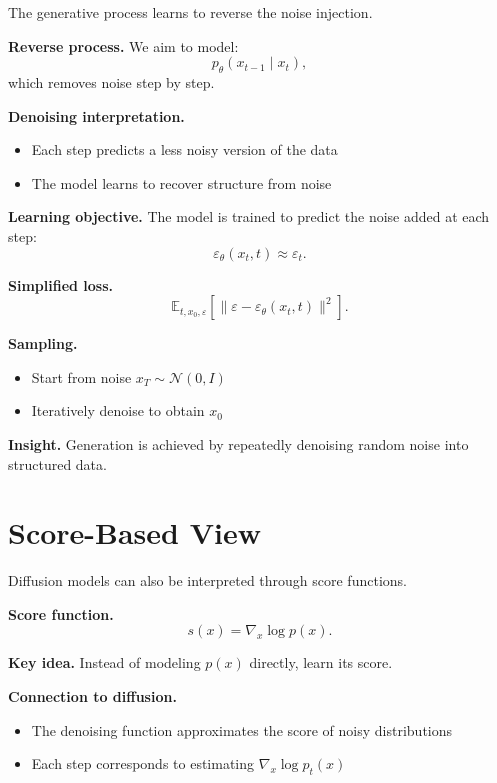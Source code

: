 The generative process learns to reverse the noise injection.

\medskip

\noindent
\textbf{Reverse process.}  
We aim to model:
\[
p_\theta(x_{t-1} \mid x_t),
\]
which removes noise step by step.

\medskip

\noindent
\textbf{Denoising interpretation.}
\begin{itemize}
    \item Each step predicts a less noisy version of the data
    \item The model learns to recover structure from noise
\end{itemize}

\medskip

\noindent
\textbf{Learning objective.}  
The model is trained to predict the noise added at each step:
\[
\varepsilon_\theta(x_t, t) \approx \varepsilon_t.
\]

\medskip

\noindent
\textbf{Simplified loss.}
\[
\mathbb{E}_{t, x_0, \varepsilon}
\left[
\| \varepsilon - \varepsilon_\theta(x_t, t) \|^2
\right].
\]

\medskip

\noindent
\textbf{Sampling.}
\begin{itemize}
    \item Start from noise $x_T \sim \mathcal{N}(0, I)$
    \item Iteratively denoise to obtain $x_0$
\end{itemize}

\medskip

\noindent
\textbf{Insight.}  
Generation is achieved by repeatedly denoising random noise into structured data.

\section{Score-Based View}

Diffusion models can also be interpreted through score functions.

\medskip

\noindent
\textbf{Score function.}
\[
s(x) = \nabla_x \log p(x).
\]

\medskip

\noindent
\textbf{Key idea.}  
Instead of modeling $p(x)$ directly, learn its score.

\medskip

\noindent
\textbf{Connection to diffusion.}
\begin{itemize}
    \item The denoising function approximates the score of noisy distributions
    \item Each step corresponds to estimating $\nabla_x \log p_t(x)$
\end{itemize}

